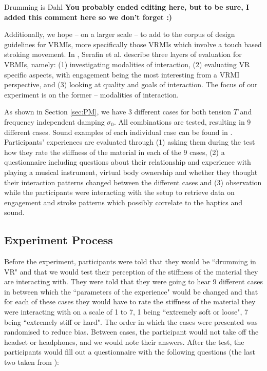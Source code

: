\documentclass{article}
\begin{document}
Drumming is Dahl \cite{Dahl2018} \textbf{You probably ended editing here, but to be sure, I added this comment here so we don't forget :)}
 
Additionally, we hope -- on a larger scale -- to add to the corpus of design guidelines for VRMIs, more specifically those VRMIs which involve a touch based stroking movement. In \cite{Serafin:2016}, Serafin et al. describe three layers of evaluation for VRMIs, namely: (1) investigating modalities of interaction, (2) evaluating VR specific aspects, with engagement being the most interesting from a VRMI perspective, and (3) looking at quality and goals of interaction. The focus of our experiment is on the former -- modalities of interaction.



As shown in Section \ref{sec:PM}, we have 3 different cases for both tension $T$ and frequency independent damping $\sigma_0$. All combinations are tested, resulting in 9 different cases. Sound examples of each individual case can be found in \cite{soundfiles}. Participants' experiences are evaluated through (1) asking them during the test how they rate the stiffness of the material in each of the 9 cases, (2) a questionnaire including questions about their relationship and experience with playing a musical instrument, virtual body ownership and whether they thought their interaction patterns changed between the different cases and (3) observation while the participants were interacting with the setup to retrieve data on engagement and stroke patterns which possibly correlate to the haptics and sound.

\subsection{Experiment Process}
Before the experiment, participants were told that they would be ``drumming in VR" and that we would test their perception of the stiffness of the material they are interacting with. They were told that they were going to hear 9 different cases in between which the ``parameters of the experience" would be changed and that for each of these cases they would have to rate the stiffness of the material they were interacting with on a scale of 1 to 7, 1 being ``extremely soft or loose", 7 being ``extremely stiff or hard". The order in which the cases were presented was randomised to reduce bias. Between cases, the participant would not take off the headset or headphones, and we would note their answers. After the test, the participants would fill out a questionnaire with the following questions (the last two taken from \cite{avanzini2006}):
\end{document}
